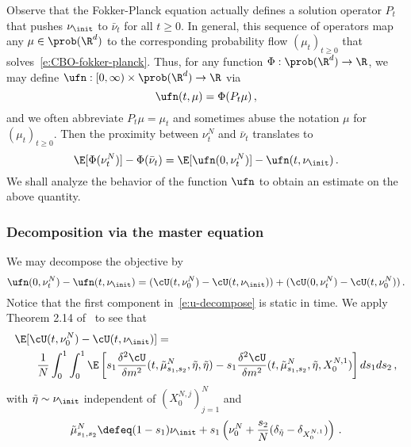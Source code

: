 \documentclass{amsart}
\begin{document}
Observe that the Fokker-Planck equation actually defines a solution operator $P_t$ that pushes $\nu_\init$ to $\bar \nu_t$ for all $t \ge 0$. 
In general, this sequence of operators map any $\mu \in \prob(\R^d)$ to the corresponding probability flow $(\mu_t)_{t \ge 0}$ that solves~\eqref{e:CBO-fokker-planck}.
Thus, for any function $\Phi: \prob(\R^d) \to \R$, we may define $\ufn: [0,\infty) \times \prob(\R^d) \to \R$ via 
\begin{equation*}
	\ufn(t, \mu) = \Phi(P_t \mu) \,,
\end{equation*}
and we often abbreviate $P_t \mu = \mu_t$ and sometimes abuse the notation $\mu$ for $(\mu_t)_{t \ge 0}$. 
Then the proximity between $\nu^N_t$ and $\bar \nu_t$ translates to
\begin{equation*}
	\E[\Phi(\nu^N_t)] - \Phi(\bar \nu_t) = \E [\ufn(0, \nu^N_t)] - \ufn(t, \nu_\init)  \,.
\end{equation*}
We shall analyze the behavior of the function $\ufn$ to obtain an estimate on the above quantity.


\subsubsection{Decomposition via the master equation}

We may decompose the objective by 
\begin{equation}
\label{e:u-decompose}
	\ufn(0, \nu^N_t) - \ufn(t, \nu_\init) = (\cU(t,\nu^N_0) - \cU(t,\nu_\init)) + (\cU(0,\nu^N_t) - \cU(t,\nu^N_0)) \,.
\end{equation}
Notice that the first component in~\eqref{e:u-decompose} is static in time. 
We apply Theorem 2.14 of~\cite{ChassagneuxSzpruchTse2022} to see that 
\begin{align}
	\nonumber
    & \E [\cU(t,\nu^N_0) - \cU(t,\nu_\init)] = \\ 
	\label{e:static-bounded}
	& \qquad \frac{1}{N} \int_0^1 \int_0^1 \E \left[ s_1 \frac{\delta^2 \cU}{\delta m^2}(t,\tilde \mu^N_{s_1,s_2}, \tilde \eta, \tilde \eta) - s_1 \frac{\delta^2 \cU}{\delta m^2}(t, \tilde \mu^N_{s_1,s_2}, \tilde \eta, X^{N,1}_0) \right] ds_1 ds_2 \,,
\end{align}
with $\tilde \eta \sim \nu_\init$ independent of $(X^{N,j}_0)_{j=1}^N$ and 
\begin{equation*}
    \tilde \mu^N_{s_1,s_2} \defeq (1-s_1) \nu_{\init} + s_1 \left( \nu^N_0 + \frac{s_2}{N} (\delta_{\tilde\eta} - \delta_{X^{N,1}_0}) \right) \,.
\end{equation*}
\end{document}
